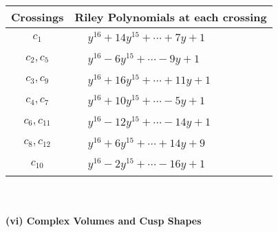 \documentclass[1p]{elsarticle_modified}
\theoremstyle{definition}
\begin{document}
\begin{tabular}{m{50pt}|m{274pt}}
Crossings & \hspace{64pt}Riley Polynomials at each crossing \\
\hline $$\begin{aligned}c_{1}\end{aligned}$$&$\begin{aligned}
&y^{16}+14 y^{15}+\cdots+7 y+1
\end{aligned}$\\
\hline $$\begin{aligned}c_{2},c_{5}\end{aligned}$$&$\begin{aligned}
&y^{16}-6 y^{15}+\cdots-9 y+1
\end{aligned}$\\
\hline $$\begin{aligned}c_{3},c_{9}\end{aligned}$$&$\begin{aligned}
&y^{16}+16 y^{15}+\cdots+11 y+1
\end{aligned}$\\
\hline $$\begin{aligned}c_{4},c_{7}\end{aligned}$$&$\begin{aligned}
&y^{16}+10 y^{15}+\cdots-5 y+1
\end{aligned}$\\
\hline $$\begin{aligned}c_{6},c_{11}\end{aligned}$$&$\begin{aligned}
&y^{16}-12 y^{15}+\cdots-14 y+1
\end{aligned}$\\
\hline $$\begin{aligned}c_{8},c_{12}\end{aligned}$$&$\begin{aligned}
&y^{16}+6 y^{15}+\cdots+14 y+9
\end{aligned}$\\
\hline $$\begin{aligned}c_{10}\end{aligned}$$&$\begin{aligned}
&y^{16}-2 y^{15}+\cdots-16 y+1
\end{aligned}$\\
\hline
\end{tabular}\\~\\
\newpage\flushleft \textbf{(vi) Complex Volumes and Cusp Shapes}
\end{document}
